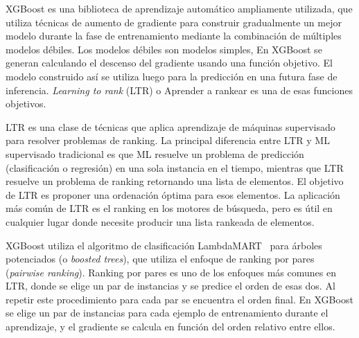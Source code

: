 XGBoost es una biblioteca de aprendizaje automático ampliamente utilizada, que utiliza técnicas de aumento de gradiente para construir gradualmente un mejor modelo durante la fase de entrenamiento mediante la combinación de múltiples modelos débiles. Los modelos débiles son modelos simples, En XGBoost se generan calculando el descenso del gradiente usando una función objetivo. El modelo construido así se utiliza luego para la predicción en una futura fase de inferencia. \textit{Learning to rank} (LTR) o Aprender a rankear es una de esas funciones objetivos.

LTR es una clase de técnicas que aplica aprendizaje de máquinas supervisado para resolver problemas de ranking. La principal diferencia entre LTR y ML supervisado tradicional es que ML resuelve un problema de predicción (clasificación o regresión) en una sola instancia en el tiempo, mientras que LTR resuelve un problema de ranking retornando una lista de elementos. El objetivo de LTR es proponer una ordenación óptima para esos elementos. La aplicación más común de LTR es el ranking en los motores de búsqueda, pero es útil en cualquier lugar donde necesite producir una lista rankeada de elementos.

XGBoost utiliza el algoritmo de clasificación LambdaMART~\cite{burges2010from} para árboles potenciados (o \textit{boosted trees}), que utiliza el enfoque de ranking por pares (\textit{pairwise ranking}). Ranking por pares es uno de los enfoques más comunes en LTR, donde se elige un par de instancias y se predice el orden de esas dos. Al repetir este procedimiento para cada par se encuentra el orden final. En XGBoost se elige un par de instancias para cada ejemplo de entrenamiento durante el aprendizaje, y el gradiente se calcula en función del orden relativo entre ellos.


